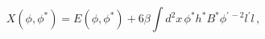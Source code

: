 \begin{equation*}
X(\phi ,\phi ^{\ast })=E(\phi ,\phi ^{\ast })+6\beta \int d^{2}x\,\phi
^{\ast }h^{\ast }B^{\ast }\phi ^{\prime \,-2}l^{\prime }l\,,
\end{equation*}


